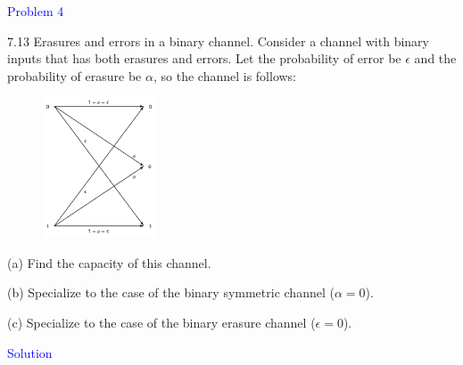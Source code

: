 \textcolor{blue}{Problem 4}

7.13 Erasures and errors in a binary channel. Consider a channel with
binary inputs that has both erasures and errors. Let the probability of error be $\epsilon$ and the probability of erasure be $\alpha$, so the channel is follows:

\begin{figure}[htbp]
    \centering
	\includegraphics[width=0.3\textwidth]{../figures/7.13.png}
\end{figure}

(a) Find the capacity of this channel.

(b) Specialize to the case of the binary symmetric channel ($\alpha = 0$).

(c) Specialize to the case of the binary erasure channel ($\epsilon = 0$).

\textcolor{blue}{Solution}

